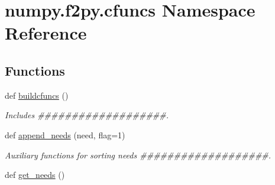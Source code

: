 \hypertarget{namespacenumpy_1_1f2py_1_1cfuncs}{}\section{numpy.\+f2py.\+cfuncs Namespace Reference}
\label{namespacenumpy_1_1f2py_1_1cfuncs}
\subsection*{Functions}
\begin{DoxyCompactItemize}
\item 
def \hyperlink{namespacenumpy_1_1f2py_1_1cfuncs_a636853937d68130bf36612127aa57732}{buildcfuncs} ()
\begin{DoxyCompactList}\small\item\em Includes \#\#\#\#\#\#\#\#\#\#\#\#\#\#\#\#\#\#\#. \end{DoxyCompactList}\item 
def \hyperlink{namespacenumpy_1_1f2py_1_1cfuncs_afb4068d4ede263a77accff45e7ccd1a6}{append\+\_\+needs} (need, flag=1)
\begin{DoxyCompactList}\small\item\em Auxiliary functions for sorting needs \#\#\#\#\#\#\#\#\#\#\#\#\#\#\#\#\#\#\#. \end{DoxyCompactList}\item 
def \hyperlink{namespacenumpy_1_1f2py_1_1cfuncs_aae5542f0788956ade12488cf6fa5f29a}{get\+\_\+needs} ()
\end{DoxyCompactItemize}
